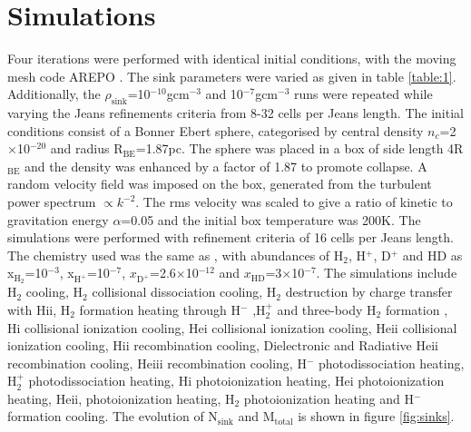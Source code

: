 \documentclass[fleqn,usenatbib]{mnras}
\begin{document}
\section{Simulations}
\label{Sims}
Four iterations were performed with identical initial conditions, with the moving mesh code AREPO \citep{Springel2010}. The sink parameters were varied as given in table \ref{table:1}.  Additionally, the $\rho_{\text{sink}}$=10$^{-10}$gcm$^{-3}$ and 10$^{-7}$gcm$^{-3}$ runs were repeated while varying the Jeans refinements criteria from 8-32 cells per Jeans length. The initial conditions consist of a Bonner Ebert sphere, categorised by central density $n_c$=2$\times$10$^{-20}$ and radius R$_{\text{BE}}$=1.87pc. The sphere was placed in a box of side length 4R$_{\text{BE}}$ and the density was enhanced by a factor of 1.87 to promote collapse. A random velocity field was imposed on the box, generated from the turbulent power spectrum $\propto k^{-2}$. The rms velocity was scaled to give a ratio of kinetic to gravitation energy $\alpha$=0.05 and the initial box temperature was 200K. The simulations were performed with refinement criteria of 16 cells per Jeans length. The chemistry used was the same as \cite{Clark2011}, with abundances of H$_2$, H$^{+}$, D$^{+}$ and HD as x$_{\text{H}_{2}}$=10$^{-3}$, x$_{\text{H}^{+}}$=10$^{-7}$, $x_{\text{D}^{+}}$=2.6$\times$10$^{-12}$ and $x_{\text{HD}}$=3$\times$10$^{-7}$. The simulations include H$_2$ cooling, H$_{2}$ collisional dissociation cooling, H$_{2}$ destruction by charge transfer with H{\sc ii}, H$_{2}$ formation heating through H$^-$ ,H$_{2}^+$ and three-body H$_{2}$ formation , H{\sc i} collisional ionization cooling, He{\sc i} collisional ionization cooling, He{\sc ii} collisional ionization cooling, H{\sc ii} recombination cooling, Dielectronic and Radiative He{\sc ii} recombination cooling, He{\sc iii} recombination cooling, H$^{-}$ photodissociation heating, H$_{2}^+$ photodissociation heating, H{\sc i} photoionization heating, He{\sc i} photoionization heating, He{\sc ii}, photoionization heating, H$_2$ photoionization heating and H$^-$ formation cooling. The evolution of N$_{\text{sink}}$ and M$_{\text{total}}$ is shown in figure \ref{fig:sinks}.
\end{document}
